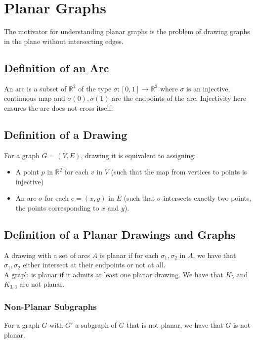 \documentclass[a4paper, 12pt, twoside]{article}
\begin{document}
\section{Planar Graphs}

The motivator for understanding planar graphs is the problem of drawing graphs in
the plane without intersecting edges.

\subsection{Definition of an Arc}

An arc is a subset of $\mathbb{R}^2$ of the type $\sigma : [0, 1] \to \mathbb{R}^2$ 
where $\sigma$ is an injective, continuous map and $\sigma(0), \sigma(1)$
are the endpoints of the arc. Injectivity here ensures the arc does not cross itself.

\subsection{Definition of a Drawing}

For a graph $G = (V, E)$, drawing it is equivalent to assigning: \begin{itemize}
  \item A point $p$ in $\mathbb{R}^2$ for each $v$ in $V$ (such that the map
  from vertices to points is injective)
  \item An arc $\sigma$ for each $e = (x, y)$ in $E$ (such that $\sigma$ intersects
  exactly two points, the points corresponding to $x$ and $y$).
\end{itemize}

\subsection{Definition of a Planar Drawings and Graphs}

A drawing with a set of arcs $A$ is planar if for each $\sigma_1, \sigma_2$ in $A$, 
we have that $\sigma_1, \sigma_2$ either intersect at their endpoints or not at all.
\\[\baselineskip]
A graph is planar if it admits at least one planar drawing. We have that $K_5$ 
and $K_{3, 3}$ are not planar.

\subsubsection{Non-Planar Subgraphs}

For a graph $G$ with $G'$ a subgraph of $G$ that is not planar, we have that
$G$ is not planar.
\end{document}
